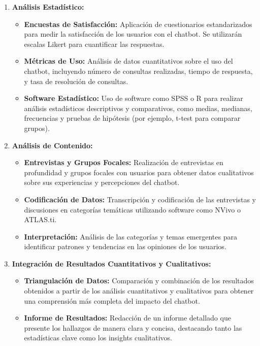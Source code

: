 \begin{enumerate}
	\item \textbf{Análisis Estadístico:}
	\begin{itemize}
		\item \textbf{Encuestas de Satisfacción:} Aplicación de cuestionarios estandarizados para medir la satisfacción de los usuarios con el chatbot. Se utilizarán escalas Likert para cuantificar las respuestas.
		\item \textbf{Métricas de Uso:} Análisis de datos cuantitativos sobre el uso del chatbot, incluyendo número de consultas realizadas, tiempo de respuesta, y tasa de resolución de consultas.
		\item \textbf{Software Estadístico:} Uso de software como SPSS o R para realizar análisis estadísticos descriptivos y comparativos, como medias, medianas, frecuencias y pruebas de hipótesis (por ejemplo, t-test para comparar grupos).
	\end{itemize}
	
	\item \textbf{Análisis de Contenido:}
	\begin{itemize}
		\item \textbf{Entrevistas y Grupos Focales:} Realización de entrevistas en profundidad y grupos focales con usuarios para obtener datos cualitativos sobre sus experiencias y percepciones del chatbot.
		\item \textbf{Codificación de Datos:} Transcripción y codificación de las entrevistas y discusiones en categorías temáticas utilizando software como NVivo o ATLAS.ti.
		\item \textbf{Interpretación:} Análisis de las categorías y temas emergentes para identificar patrones y tendencias en las opiniones de los usuarios.
	\end{itemize}
	
	\item \textbf{Integración de Resultados Cuantitativos y Cualitativos:}
	\begin{itemize}
		\item \textbf{Triangulación de Datos:} Comparación y combinación de los resultados obtenidos a partir de los análisis cuantitativos y cualitativos para obtener una comprensión más completa del impacto del chatbot.
		\item \textbf{Informe de Resultados:} Redacción de un informe detallado que presente los hallazgos de manera clara y concisa, destacando tanto las estadísticas clave como los insights cualitativos.
	\end{itemize}
\end{enumerate}



